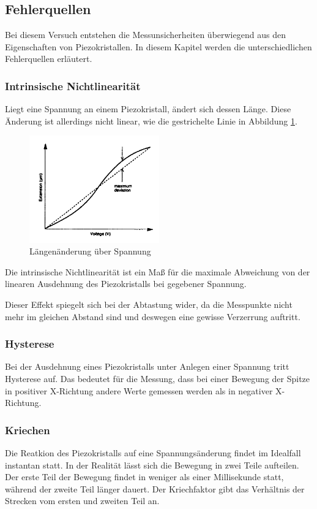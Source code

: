 \subsection{Fehlerquellen}
\label{kap2}

\noindent Bei diesem Versuch entstehen die Messunsicherheiten überwiegend aus den Eigenschaften von Piezokristallen. In diesem Kapitel werden die unterschiedlichen Fehlerquellen erläutert.

\subsubsection{Intrinsische Nichtlinearität}
Liegt eine Spannung an einem Piezokristall, ändert sich dessen Länge. Diese Änderung ist allerdings nicht linear, wie die gestrichelte Linie in Abbildung \ref{fig:nichtlinear}.  

\begin{figure}
	\centering
		\includegraphics[width=0.5\textwidth]{nichtlinearitat.png}
	\caption{Längenänderung über Spannung}
	\label{fig:nichtlinear}
\end{figure}

\noindent Die intrinsische Nichtlinearität ist ein Maß für die maximale Abweichung von der linearen Ausdehnung des Piezokristalls bei gegebener Spannung. 

\noindent Dieser Effekt spiegelt sich bei der Abtastung wider, da die Messpunkte nicht mehr im gleichen Abstand sind und deswegen eine gewisse Verzerrung auftritt.

\subsubsection{Hysterese}
Bei der Ausdehnung eines Piezokristalls unter Anlegen einer Spannung tritt Hysterese auf.
Das bedeutet für die Messung, dass bei einer Bewegung der Spitze in positiver X-Richtung andere Werte gemessen werden als in negativer X-Richtung.

\subsubsection{Kriechen}
Die Reatkion des Piezokristalls auf eine Spannungsänderung findet im Idealfall instantan statt.
In der Realität lässt sich die Bewegung in zwei Teile aufteilen.
Der erste Teil der Bewegung findet in weniger als einer Millisekunde statt, während der zweite Teil länger dauert.
Der Kriechfaktor gibt das Verhältnis der Strecken vom ersten und zweiten Teil an.

